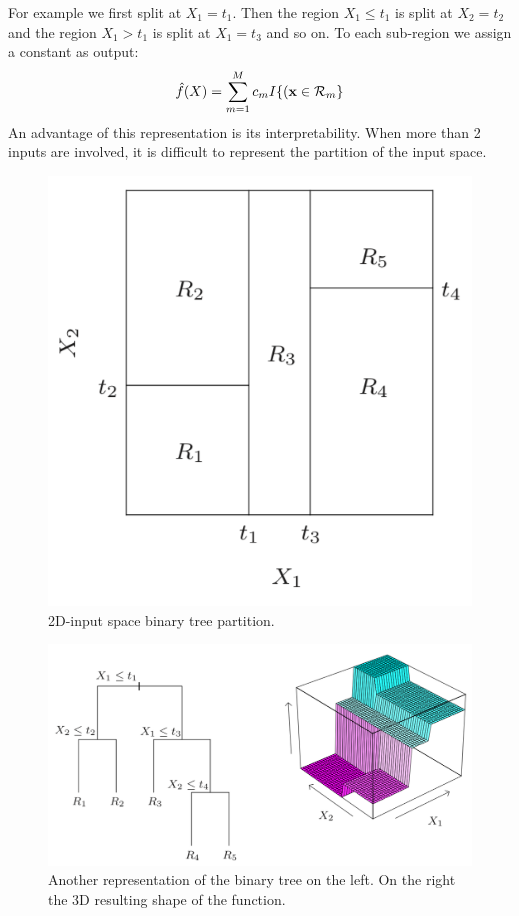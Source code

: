 For example we first split at $X_1 = t_1$. Then the region $X_1 \le t_1$ is split at $X_2 =t_2$ and the region $X_1 >t_1$ is split at $X_1 =t_3$ and so on. To each sub-region we assign a constant as output:
\begin{equation}
\hat{f}(X) = \sum_{m=1}^M c_m I\{(\x \in \CMcal{R}_m\}
\end{equation}
An advantage of this representation is its interpretability. When more than 2 inputs are involved, it is difficult to represent the partition of the input space. 
\begin{figure}
\includegraphics[scale=0.4]{img/tree1}
\caption{2D-input space binary tree partition.}
\label{tree1}
\end{figure}
\begin{figure}
\includegraphics[scale=0.39]{img/tree2}
\caption{Another representation of the binary tree on the left. On the right the 3D resulting shape of the function.}
\label{tree2}
\end{figure}
